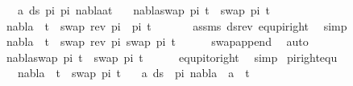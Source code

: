 \begin{isabellebody}
\ \ \ {\isachardoublequoteopen}{\isasymforall}a{\isasymin}\ ds\ pi{}\ pi{}{\isachardot}{\kern0pt}\ nabla{\isasymturnstile}a{\isasymsharp}t{\isachardoublequoteclose}\isanewline
\ \ \ {\isachardoublequoteopen}nabla{\isasymturnstile}swap\ pi{}\ t\ {\isasymapprox}\ swap\ pi{}\ t{\isachardoublequoteclose}\isanewline
%
\isadelimproof
%
\endisadelimproof
%
\isatagproof
{}\isamarkupfalse%
{\isacharminus}{\kern0pt}\isanewline
\ \ \isamarkupfalse%
\ {\isachardoublequoteopen}nabla\ {\isasymturnstile}\ t\ {\isasymapprox}\ swap\ {\isacharparenleft}{\kern0pt}rev\ pi{}\ {\isacharat}{\kern0pt}\ pi{}{\isacharparenright}{\kern0pt}\ t{\isachardoublequoteclose}\ \isanewline
\ \ \ \ \isamarkupfalse%
\ assms\ ds{\isacharunderscore}{\kern0pt}rev\ equ{\isacharunderscore}{\kern0pt}pi{\isacharunderscore}{\kern0pt}right\ \isamarkupfalse%
\ simp\isanewline
\ \ \isamarkupfalse%
\ {\isachardoublequoteopen}nabla\ {\isasymturnstile}\ t\ {\isasymapprox}\ swap\ {\isacharparenleft}{\kern0pt}rev\ pi{}{\isacharparenright}{\kern0pt}\ {\isacharparenleft}{\kern0pt}swap\ pi{}\ t{\isacharparenright}{\kern0pt}{\isachardoublequoteclose}\isanewline
\ \ \ \ \isamarkupfalse%
\ swap{\isacharunderscore}{\kern0pt}append\ \isamarkupfalse%
\ auto\isanewline
\ \ \isamarkupfalse%
\ \isamarkupfalse%
\ {\isachardoublequoteopen}nabla{\isasymturnstile}swap\ pi{}\ t\ {\isasymapprox}\ swap\ pi{}\ t{\isachardoublequoteclose}\isanewline
\ \ \ \ \isamarkupfalse%
\ equ{\isacharunderscore}{\kern0pt}pi{\isacharunderscore}{\kern0pt}to{\isacharunderscore}{\kern0pt}right\ \isamarkupfalse%
\ simp\isanewline
{}\isamarkupfalse%
%
\endisatagproof
{\isafoldproof}%
%
\isadelimproof
\isanewline
%
\endisadelimproof
\isanewline
{}\isamarkupfalse%
\ pi{\isacharunderscore}{\kern0pt}right{\isacharunderscore}{\kern0pt}equ{\isacharcolon}{\kern0pt}\ \isanewline
\ \ \ {\isachardoublequoteopen}nabla\ {\isasymturnstile}\ t\ {\isasymapprox}\ swap\ pi\ t{\isachardoublequoteclose}\isanewline
\ \ \ {\isachardoublequoteopen}{\isasymforall}a{\isasymin}\ ds\ {\isacharbrackleft}{\kern0pt}{\isacharbrackright}{\kern0pt}\ pi{\isachardot}{\kern0pt}\ nabla\ {\isasymturnstile}\ a\ {\isasymsharp}\ t{\isachardoublequoteclose}\isanewline

\end{isabellebody}

